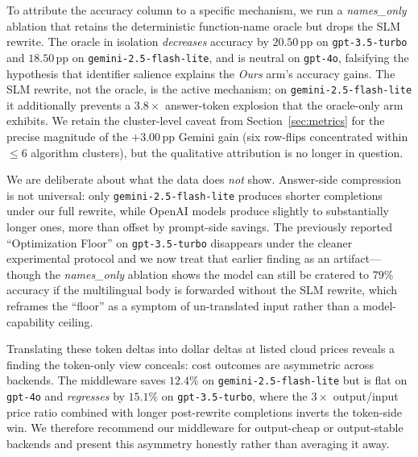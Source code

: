 \documentclass[11pt,a4paper,twocolumn]{article}
\begin{document}
To attribute the accuracy column to a specific mechanism, we run a \textit{names\_only} ablation that retains the deterministic function-name oracle but drops the SLM rewrite. The oracle in isolation \emph{decreases} accuracy by $20.50$\,pp on \texttt{gpt-3.5-turbo} and $18.50$\,pp on \texttt{gemini-2.5-flash-lite}, and is neutral on \texttt{gpt-4o}, falsifying the hypothesis that identifier salience explains the \textit{Ours} arm's accuracy gains. The SLM rewrite, not the oracle, is the active mechanism; on \texttt{gemini-2.5-flash-lite} it additionally prevents a $3.8\times$ answer-token explosion that the oracle-only arm exhibits. We retain the cluster-level caveat from Section~\ref{sec:metrics} for the precise magnitude of the $+3.00$\,pp Gemini gain (six row-flips concentrated within $\le 6$ algorithm clusters), but the qualitative attribution is no longer in question.

We are deliberate about what the data does \emph{not} show. Answer-side compression is not universal: only \texttt{gemini-2.5-flash-lite} produces shorter completions under our full rewrite, while OpenAI models produce slightly to substantially longer ones, more than offset by prompt-side savings. The previously reported ``Optimization Floor'' on \texttt{gpt-3.5-turbo} disappears under the cleaner experimental protocol and we now treat that earlier finding as an artifact---though the \textit{names\_only} ablation shows the model can still be cratered to $79\%$ accuracy if the multilingual body is forwarded without the SLM rewrite, which reframes the ``floor'' as a symptom of un-translated input rather than a model-capability ceiling.

Translating these token deltas into dollar deltas at listed cloud prices reveals a finding the token-only view conceals: cost outcomes are asymmetric across backends. The middleware saves $12.4\%$ on \texttt{gemini-2.5-flash-lite} but is flat on \texttt{gpt-4o} and \textit{regresses} by $15.1\%$ on \texttt{gpt-3.5-turbo}, where the $3\times$ output/input price ratio combined with longer post-rewrite completions inverts the token-side win. We therefore recommend our middleware for output-cheap or output-stable backends and present this asymmetry honestly rather than averaging it away.
\end{document}
